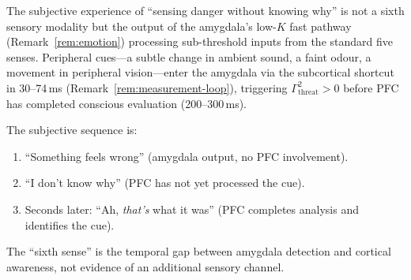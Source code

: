 \documentclass[aps,pre,twocolumn,superscriptaddress,floatfix]{revtex4-2}
\begin{document}
\begin{remark}
\label{rem:sixth-sense}
The subjective experience of ``sensing danger without
knowing why'' is not a sixth sensory modality but the
output of the amygdala's low-$K$ fast pathway
(Remark~\ref{rem:emotion}) processing sub-threshold
inputs from the standard five senses.
Peripheral cues---a subtle change in ambient sound,
a faint odour, a movement in peripheral vision---enter
the amygdala via the subcortical shortcut in
30--74\,ms (Remark~\ref{rem:measurement-loop}),
triggering $\Gamma^2_{\text{threat}} > 0$ before PFC
has completed conscious evaluation (200--300\,ms).

The subjective sequence is:
\begin{enumerate}
  \item ``Something feels wrong'' (amygdala output,
    no PFC involvement).
  \item ``I don't know why'' (PFC has not yet processed
    the cue).
  \item Seconds later: ``Ah, \emph{that's} what it was''
    (PFC completes analysis and identifies the cue).
\end{enumerate}
The ``sixth sense'' is the temporal gap between
amygdala detection and cortical awareness, not evidence
of an additional sensory channel.
\end{remark}
\end{document}
